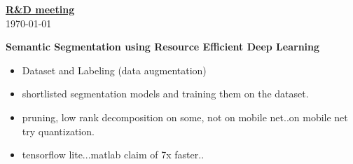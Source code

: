 \documentclass[14pt]{extarticle}
\begin{document}
\begin{center}
\begin{Large}

\underline{\textbf{R\&D meeting}}\\
\vspace{3mm}
\today
\vspace{3mm}

\textbf{Semantic Segmentation using Resource Efficient Deep Learning}

\end{Large}
\end{center}

\begin{itemize}
	\item Dataset and Labeling (data augmentation)
	\item shortlisted segmentation models and training them on the dataset.
	\item pruning, low rank decomposition on some, not on mobile net..on mobile net try quantization.
	\item tensorflow lite...matlab claim of 7x faster..
\end{itemize}




\end{document}
